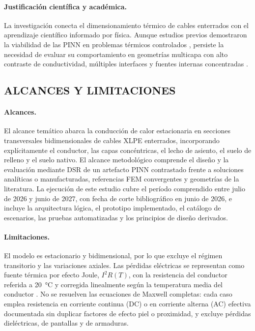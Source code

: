\paragraph{Justificación científica y académica.}
La investigación conecta el dimensionamiento térmico de cables enterrados con el aprendizaje científico informado por física. Aunque estudios previos demostraron la viabilidad de las PINN en problemas térmicos controlados \parencites[1--3,17]{xing2023}[1,3,16]{pan2025}, persiste la necesidad de evaluar su comportamiento en geometrías multicapa con alto contraste de conductividad, múltiples interfaces y fuentes internas concentradas \parencite[2--6]{ren2025}.

\subsection{ALCANCES Y LIMITACIONES}

\paragraph{Alcances.}
El alcance temático abarca la conducción de calor estacionaria en secciones transversales bidimensionales de cables XLPE enterrados, incorporando explícitamente el conductor, las capas concéntricas, el lecho de asiento, el suelo de relleno y el suelo nativo. El alcance metodológico comprende el diseño y la evaluación mediante DSR de un artefacto PINN contrastado frente a soluciones analíticas o manufacturadas, referencias FEM convergentes y geometrías de la literatura. La ejecución de este estudio cubre el período comprendido entre julio de 2026 y junio de 2027, con fecha de corte bibliográfico en junio de 2026, e incluye la arquitectura lógica, el prototipo implementado, el catálogo de escenarios, las pruebas automatizadas y los principios de diseño derivados.

\paragraph{Limitaciones.}
El modelo es estacionario y bidimensional, por lo que excluye el régimen transitorio y las variaciones axiales. Las pérdidas eléctricas se representan como fuente térmica por efecto Joule, $I^2R(T)$, con la resistencia del conductor referida a \SI{20}{\celsius} y corregida linealmente según la temperatura media del conductor \parencites[752--760]{neher1957}[cláusulas~4--5]{iec60287}. No se resuelven las ecuaciones de Maxwell completas: cada caso emplea resistencia en corriente continua (DC) o en corriente alterna (AC) efectiva documentada sin duplicar factores de efecto piel o proximidad, y excluye pérdidas dieléctricas, de pantallas y de armaduras.


